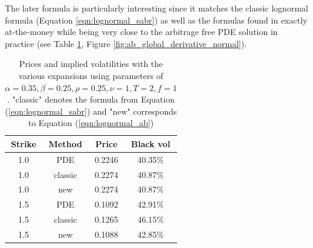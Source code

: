 \documentclass[]{rAMF2e}
\begin{document}
The later formula is particularly interesting since it matches the classic lognormal formula (Equation \ref{eqn:lognormal_sabr}) as well as the formulas found in \citep{hagan2002managing, obloj2008fine} exactly at-the-money while being very close to the arbitrage free PDE solution in practice (see Table \ref{tbl:ab_formulas}, Figure \ref{fig:ab_global_derivative_normal}).
\begin{table}[h]
\begin{center}
\caption{\label{tbl:ab_formulas} Prices and implied volatilities with the various expansions using parameters of \citep{hagan2014arbitragetalk} $\alpha= 0.35, \beta=0.25, \rho=0.25, \nu=1, T=2, f=1$. "classic" denotes the formula from Equation (\ref{eqn:lognormal_sabr}) and "new" corresponds to Equation (\ref{eqn:lognormal_ab}) }
\begin{tabular}{c c c c}
\hline
Strike & Method & Price & Black vol \\ \hline
1.0 & PDE & 0.2246 & 40.35\% \\
1.0 & classic & 0.2274 & 40.87\% \\
1.0 & new & 0.2274 & 40.87\% \\ \hline
1.5 & PDE & 0.1092 & 42.91\% \\
1.5 & classic & 0.1265 & 46.15\% \\
1.5 & new & 0.1088 & 42.85\% \\ \hline
\end{tabular}
\end{center}
\end{table}
\end{document}
